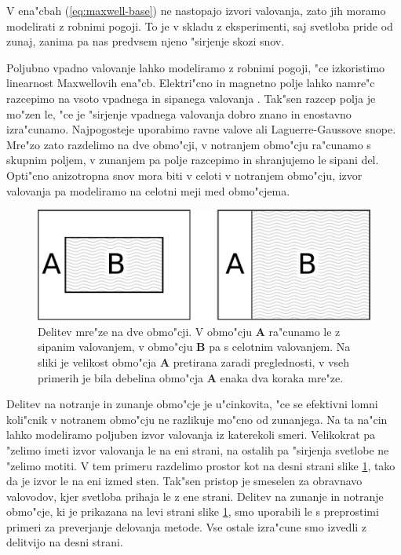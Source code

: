 \documentclass[12pt,twoside,openright,final]{report}
\begin{document}
V ena"cbah (\ref{eq:maxwell-base}) ne nastopajo izvori valovanja, zato jih moramo modelirati z robnimi pogoji. 
To je v skladu z eksperimenti, saj svetloba pride od zunaj, zanima pa nas predvsem njeno "sirjenje skozi snov. 

Poljubno vpadno valovanje lahko modeliramo z robnimi pogoji, "ce izkoristimo linearnost Maxwellovih ena"cb. 
Elektri"cno in magnetno polje lahko namre"c razcepimo na vsoto vpadnega in sipanega valovanja \cite{taflove}. 
Tak"sen razcep polja je mo"zen le, "ce je "sirjenje vpadnega valovanja dobro znano in enostavno izra"cunamo. 
Najpogosteje uporabimo ravne valove ali Laguerre-Gaussove snope. 
Mre"zo zato razdelimo na dve obmo"cji, v notranjem obmo"cju ra"cunamo s skupnim poljem, v zunanjem pa polje razcepimo in shranjujemo le sipani del.
Opti"cno anizotropna snov mora biti v celoti v notranjem obmo"cju, izvor valovanja pa modeliramo na celotni meji med obmo"cjema. 

\begin{figure}[h]
 \centering
 \includegraphics[width=.8\textwidth]{wave-source-regions}
 \caption{Delitev mre"ze na dve obmo"cji. V obmo"cju \textbf{A} ra"cunamo le z sipanim valovanjem, v obmo"cju \textbf{B} pa s celotnim valovanjem. Na sliki je velikost obmo"cja \textbf{A} pretirana zaradi preglednosti, v vseh primerih je bila debelina obmo"cja \textbf{A} enaka dva koraka mre"ze. }
 \label{fig:wave-source-regions}
\end{figure}

Delitev na notranje in zunanje obmo"cje je u"cinkovita, "ce se efektivni lomni koli"cnik v notranem obmo"cju ne razlikuje mo"cno od zunanjega. 
Na ta na"cin lahko modeliramo poljuben izvor valovanja iz katerekoli smeri. 
Velikokrat pa "zelimo imeti izvor valovanja le na eni strani, na ostalih pa "sirjenja svetlobe ne "zelimo motiti. 
V tem primeru razdelimo prostor kot na desni strani slike \ref{fig:wave-source-regions}, tako da je izvor le na eni izmed sten. 
Tak"sen pristop je smeselen za obravnavo valovodov, kjer svetloba prihaja le z ene strani. 
Delitev na zunanje in notranje obmo"cje, ki je prikazana na levi strani slike \ref{fig:wave-source-regions}, smo uporabili le s preprostimi primeri za preverjanje delovanja metode. 
Vse ostale izra"cune smo izvedli z delitvijo na desni strani. 
\end{document}
